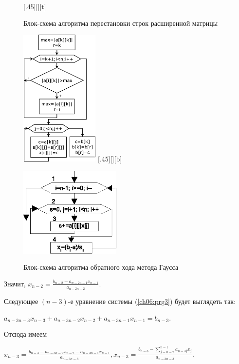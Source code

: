 \begin{figure}[h]
\begin{floatrow}
[.45\textwidth][\FBheight][t]
{\caption{Блок-схема алгоритма перестановки строк расширенной матрицы}
\label{ch06:refDrawing12}}
{\includegraphics[width=0.35\textwidth,keepaspectratio]{img/ris_6_13}}\hspace*{0.05\textwidth}
%
[.45\textwidth][\FBheight][b]
{\caption{Блок-схема алгоритма обратного хода метода Гаусса}
\label{ch06:refDrawing13}}
{\includegraphics[width=0.45\textwidth,keepaspectratio]{img/ris_6_14}}
\end{floatrow}
\end{figure}



Значит, $x_{n-2}=\frac{b_{n-2}-a_{n-2n-1}x_{n-1}}{a_{n-2n-2}}$.

Следующее $(n-3)$-е уравнение системы (\ref{ch06:prg3}) будет выглядеть так:

 $a_{n-3n-3}x_{n-3}+a_{n-3n-2}x_{n-2}+a_{n-3n-1}x_{n-1}=b_{n-3}$.

Отсюда имеем

 $x_{n-3}=\frac{b_{n-3}-a_{n-3n-2}x_{n-2}-a_{n-3n-1}x_{n-1}}{a_{n-3n-3}},x_{n-3}=
\frac{b_{n-3}-\sum\limits_{j=n-2}^{n-1}{a_{n-3j}x_j}}{a_{n-3n-3}}$.

